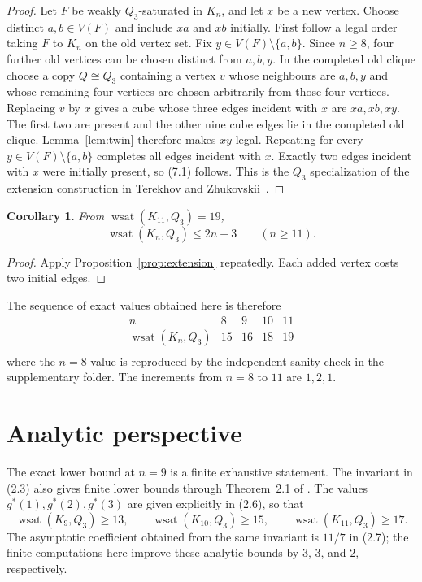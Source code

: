 \documentclass[11pt]{article}
\numberwithin{equation}{section}
\newtheorem{corollary}[theorem]{Corollary}
\newcommand{\wsat}{\operatorname{wsat}}
\begin{document}
\begin{proof}
Let $F$ be weakly $Q_3$-saturated in $K_n$, and let $x$ be a new vertex.
Choose distinct $a,b\in V(F)$ and include $xa$ and $xb$ initially. First follow
a legal order taking $F$ to $K_n$ on the old vertex set. Fix
$y\in V(F)\setminus\{a,b\}$. Since $n\ge8$, four further old vertices can be
chosen distinct from $a,b,y$. In the completed old clique choose a copy
$Q\cong Q_3$ containing a vertex $v$ whose neighbours are $a,b,y$ and whose
remaining four vertices are chosen arbitrarily from those four vertices.
Replacing $v$ by $x$ gives a cube whose three edges incident with $x$ are
$xa,xb,xy$. The first two are present and the other nine cube edges lie in the
completed old clique. Lemma~\ref{lem:twin} therefore makes $xy$ legal. Repeating
for every $y\in V(F)\setminus\{a,b\}$ completes all edges incident with $x$.
Exactly two edges incident with $x$ were initially present, so (7.1) follows.
This is the $Q_3$ specialization of the extension construction in
Terekhov and Zhukovskii~\cite{TZ2025}.
\end{proof}

\begin{corollary}\label{cor:family}
From $\wsat(K_{11},Q_3)=19$,
\[
\boxed{\wsat(K_n,Q_3)\le2n-3\qquad(n\ge11).}
\tag{7.2}
\]
\end{corollary}

\begin{proof}
Apply Proposition~\ref{prop:extension} repeatedly. Each added vertex costs two initial edges.
\end{proof}

The sequence of exact values obtained here is therefore
\[
\begin{array}{c|cccc}
n&8&9&10&11\\ \hline
\wsat(K_n,Q_3)&15&16&18&19\\
\end{array}
\tag{7.3}
\]
where the $n=8$ value is reproduced by the independent sanity check in the supplementary folder. The increments from $n=8$ to $11$ are $1,2,1$.

\section{Analytic perspective}\label{sec:analytic}
The exact lower bound at $n=9$ is a finite exhaustive statement. The invariant in (2.3) also gives finite lower bounds through Theorem~2.1 of \cite{TZ2025}. The values $g^*(1),g^*(2),g^*(3)$ are given explicitly in (2.6), so that
\[
\wsat(K_9,Q_3)\ge13,\qquad
\wsat(K_{10},Q_3)\ge15,\qquad
\wsat(K_{11},Q_3)\ge17.
\]
The asymptotic coefficient obtained from the same invariant is $11/7$ in (2.7); the finite computations here improve these analytic bounds by $3$, $3$, and $2$, respectively.
\end{document}
